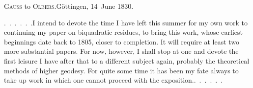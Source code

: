 \begin{center}
\textsc{Gauss} to \textsc{Olbers}.\quad Göttingen, 14~June 1830.
\end{center}

\par\noindent\hspace*{\parindent}\mbox{.\ .\ .\ .\ .\ .}\quad I intend to devote the time I have left this summer for my own work to continuing my paper on biquadratic residues, to bring this work, whose earliest beginnings date back to 1805, closer to completion.
It will require at least two more substantial papers. For now, however, I shall stop at one and devote the first leisure I have after that to a different subject again, probably the theoretical methods of higher geodesy.
For quite some time it has been my fate always to take up work in which one cannot proceed  with the exposition.\quad\mbox{.\ .\ .\ .\ .\ .}
